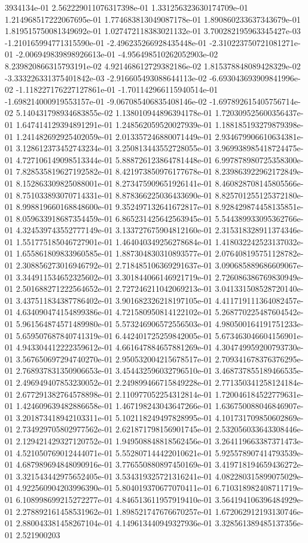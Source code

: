 3934134e-01	2.562229011076317398e-01	1.331256323630174709e-01	1.214968517222067695e-01	1.774683813049087178e-01	1.890860233637343679e-01	1.819515750081349692e-01	1.027472118383021132e-01	3.700282195963345427e-03	-1.210165994771315590e-01	-2.496235266928435448e-01	-2.310223750721081271e-01	-2.006949839898926613e-01	-4.956498510262052903e-02	8.239820866315793191e-02	4.921468612729382186e-02	1.815378848089428329e-02	-3.333226331375401842e-03	-2.916605493088644113e-02	-6.693043693909841996e-02	-1.118227176227127861e-01	-1.701142966115940514e-01	-1.698214000919553157e-01	-9.067085406835408146e-02	-1.697892615405756714e-02	5.140431798934683855e-02	1.138010944896394178e-01	1.720309525600356437e-01	1.647414129394891291e-01	1.248562059520027939e-01	1.188185193279879398e-01	1.241482692925402059e-01	2.013357246880071449e-01	2.934679906610634381e-01	3.128612373452743234e-01	3.250813443552728055e-01	3.969938985418724475e-01	4.727106149098513344e-01	5.888726123864781448e-01	6.997878980725358300e-01	7.828535819627192582e-01	8.421973850976177678e-01	8.239863922962172849e-01	8.152863309825088001e-01	8.273475909651926141e-01	8.460828708145805566e-01	8.751033893070714331e-01	8.878366225036433690e-01	8.825701255125372180e-01	8.998819660168848600e-01	9.352497132641672817e-01	8.928429874458135851e-01	8.059633918687354459e-01	6.865231425642563945e-01	5.544389933095362766e-01	4.324539743552777149e-01	3.133727675904812160e-01	2.315318328911374346e-01	1.551775185046727901e-01	1.464040349256278684e-01	1.418032242523137032e-01	1.655861809833960585e-01	1.887304830310893577e-01	2.076408195751128782e-01	2.308856273016946792e-01	2.718485106369291637e-01	3.090685889686609067e-01	3.344911534652325602e-01	3.301844066146921719e-01	2.726086386769830949e-01	2.501688271222564652e-01	2.727246211042069213e-01	3.041331508528720140e-01	3.437511834387786402e-01	3.901682326218197105e-01	4.411719111364082457e-01	4.634090474154899386e-01	4.721580950814122102e-01	5.268770225487604542e-01	5.961564874571489980e-01	5.573246906572556503e-01	4.980500164191751233e-01	5.659507687840741319e-01	6.442401725259842005e-01	5.673463046604156901e-01	4.943304412222359612e-01	4.661647884657881269e-01	4.304749959200793730e-01	3.567650697294740270e-01	2.950532004215678517e-01	2.709341678376376295e-01	2.768937831350906653e-01	3.454432596032796510e-01	3.468737855189466535e-01	2.496949407853230052e-01	2.249899466715849228e-01	2.771350341258124184e-01	2.677291382764578898e-01	2.110977052254312814e-01	1.720046184522779631e-01	1.424609639482886658e-01	1.467198243043647266e-01	1.636750088046846907e-01	3.201873418942103311e-01	5.102118249497828995e-01	4.101731709850602869e-01	2.734929705802977562e-01	2.621871798156901745e-01	2.532056033643308446e-01	2.129421429327120752e-01	1.949508848818562456e-01	3.264119663387371473e-01	4.521050769012444071e-01	5.552807144422010621e-01	5.925578907414793539e-01	4.687989694848090916e-01	3.776550880897450169e-01	3.419718194659436272e-01	3.321543442975652405e-01	3.534319325721316241e-01	4.082280315899075029e-01	4.922560904203996390e-01	5.804019370677070411e-01	6.710318982408711719e-01	6.108998699215272277e-01	4.846513611957919410e-01	3.564194106396484929e-01	2.278892161458531962e-01	1.898521747676670257e-01	1.672062912193130746e-01	2.880043381458267104e-01	4.149613440949327936e-01	3.328561389485137356e-01	2.521900203